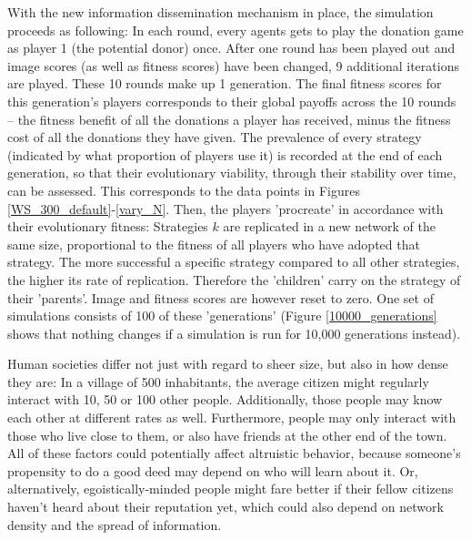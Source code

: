 \documentclass{JASSS}
\begin{document}

With the new information dissemination mechanism in place, the simulation proceeds as following: In each round, every agents gets to play the donation game as player 1 (the potential donor) once. After one round has been played out and image scores (as well as fitness scores) have been changed, 9 additional iterations are played. These 10 rounds make up 1 generation. The final fitness scores for this generation's players corresponds to their global payoffs across the 10 rounds -- the fitness benefit of all the donations a player has received, minus the fitness cost of all the donations they have given. The prevalence of every strategy (indicated by what proportion of players use it) is recorded at the end of each generation, so that their evolutionary viability, through their stability over time, can be assessed. This corresponds to the data points in Figures \ref{WS_300_default}-\ref{vary_N}. Then, the players 'procreate' in accordance with their evolutionary fitness: Strategies $k$ are replicated in a new network of the same size, proportional to the fitness of all players who have adopted that strategy. The more successful a specific strategy compared to all other strategies, the higher its rate of replication. Therefore the 'children' carry on the strategy of their 'parents'. Image and fitness scores are however reset to zero. One set of simulations consists of 100 of these 'generations' (Figure \ref{10000_generations} shows that nothing changes if a simulation is run for 10,000 generations instead).

Human societies differ not just with regard to sheer size, but also in how dense they are: In a village of 500 inhabitants, the average citizen might regularly interact with 10, 50 or 100 other people. Additionally, those people may know each other at different rates as well. Furthermore, people may only interact with those who live close to them, or also have friends at the other end of the town. All of these factors could potentially affect altruistic behavior, because someone's propensity to do a good deed may depend on who will learn about it. Or, alternatively, egoistically-minded people might fare better if their fellow citizens haven't heard about their reputation yet, which could also depend on network density and the spread of information.
\end{document}
